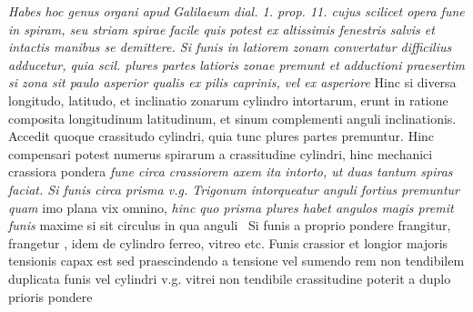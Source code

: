 \textit{Habes hoc genus organi apud }
\textit{Galilaeum}\protect{}
\textit{dial. 1. prop. 11. cujus scilicet opera fune in spiram, seu striam spirae 
facile quis potest ex altissimis fenestris salvis et intactis manibus se demittere. Si funis in latiorem zonam convertatur difficilius adducetur, quia scil. plures partes latioris zonae premunt et adductioni 
praesertim si zona sit paulo asperior qualis ex pilis caprinis\protect{}, vel ex asperiore\protect{} } Hinc si diversa longitudo, latitudo, et inclinatio zonarum cylindro intortarum, erunt in ratione composita longitudinum latitudinum, et sinum complementi anguli inclinationis. Accedit quoque crassitudo cylindri, quia tunc plures partes premuntur. Hinc compensari potest numerus spirarum a crassitudine cylindri, hinc mechanici crassiora pondera 
\textit{fune circa crassiorem axem ita intorto, ut duas tantum spiras faciat. Si funis circa prisma v.g. Trigonum intorqueatur anguli fortius premuntur quam } imo plana vix omnino, 
\textit{hinc quo prisma plures habet angulos magis premit funis } maxime si sit circulus in qua anguli 
\pend 
\newpage
\count{}
\count{}
\pstart {} \,  Si funis a proprio pondere frangitur, frangetur , idem de cylindro ferreo, vitreo etc. Funis crassior et longior majoris tensionis capax est sed praescindendo a tensione vel sumendo rem non tendibilem duplicata funis vel cylindri v.g. vitrei non tendibile crassitudine poterit a duplo prioris pondere 
